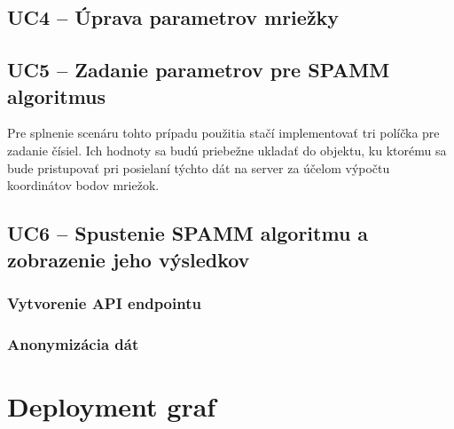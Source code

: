 \subsection {UC4 -- Úprava parametrov mriežky}

\subsection {UC5 -- Zadanie parametrov pre SPAMM algoritmus}
Pre splnenie scenáru tohto prípadu použitia stačí implementovať tri políčka pre zadanie čísiel. Ich hodnoty sa budú priebežne ukladať do objektu, ku ktorému sa bude pristupovať pri posielaní týchto dát na server za účelom výpočtu koordinátov bodov mriežok.

\subsection {UC6 -- Spustenie SPAMM algoritmu a zobrazenie jeho výsledkov}

\subsubsection {Vytvorenie API endpointu}

\subsubsection {Anonymizácia dát}

\section {Deployment graf}